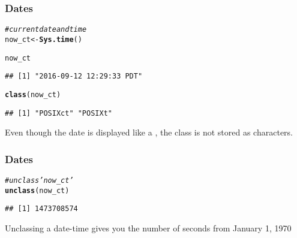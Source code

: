 \documentclass[12pt]{beamer}\usepackage[]{graphicx}\usepackage[]{color}
\makeatletter
\newcommand{\hlcom}[1]{\textcolor[rgb]{0.678,0.584,0.686}{\textit{#1}}}%
\newcommand{\hlstd}[1]{\textcolor[rgb]{0.345,0.345,0.345}{#1}}%
\newcommand{\hlkwb}[1]{\textcolor[rgb]{0.69,0.353,0.396}{#1}}%
\newcommand{\hlkwd}[1]{\textcolor[rgb]{0.737,0.353,0.396}{\textbf{#1}}}%
\newenvironment{kframe}{%
 \def\at@end@of@kframe{}%
 \ifinner\ifhmode%
  \def\at@end@of@kframe{\end{minipage}}%
  \begin{minipage}{\columnwidth}%
 \fi\fi%
 \def\FrameCommand##1{\hskip\@totalleftmargin \hskip-\fboxsep
 \colorbox{shadecolor}{##1}\hskip-\fboxsep
     \hskip-\linewidth \hskip-\@totalleftmargin \hskip\columnwidth}%
 \MakeFramed {\advance\hsize-\width
   \@totalleftmargin\z@ \linewidth\hsize
   \@setminipage}}%
 {\par\unskip\endMakeFramed%
 \at@end@of@kframe}
\newenvironment{knitrout}{}{} %
\makeatother
\begin{document}

\begin{frame}[fragile]
\frametitle{ Dates}

\begin{knitrout}\footnotesize
{}\color{fgcolor}\begin{kframe}
\begin{alltt}
\hlcom{# current date and time}
\hlstd{now_ct} \hlkwb{<-} \hlkwd{Sys.time}\hlstd{()}

\hlstd{now_ct}
\end{alltt}
\begin{verbatim}
## [1] "2016-09-12 12:29:33 PDT"
\end{verbatim}
\begin{alltt}
\hlkwd{class}\hlstd{(now_ct)}
\end{alltt}
\begin{verbatim}
## [1] "POSIXct" "POSIXt"
\end{verbatim}
\end{kframe}
\end{knitrout}
Even  though the date is displayed like a , the class  is not stored as characters.

\end{frame}


\begin{frame}[fragile]
\frametitle{ Dates}

\begin{knitrout}\footnotesize
{}\color{fgcolor}\begin{kframe}
\begin{alltt}
\hlcom{# unclass 'now_ct'}
\hlkwd{unclass}\hlstd{(now_ct)}
\end{alltt}
\begin{verbatim}
## [1] 1473708574
\end{verbatim}
\end{kframe}
\end{knitrout}
Unclassing a  date-time gives you the number of seconds from January 1, 1970

\end{frame}

\end{document}
